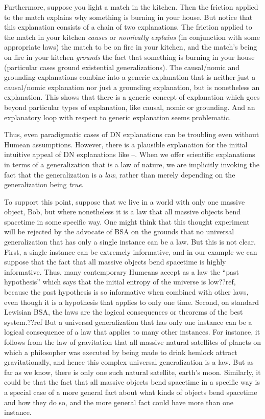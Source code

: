 Furthermore, suppose you light a match in the kitchen. Then the friction applied to the match explains why something is burning in 
your house. But notice that this explanation consists of a chain of two explanations. The friction applied to the match in your 
kitchen \textit{causes} or \textit{nomically explains} (in conjunction with some appropriate laws) the match to be on fire in your kitchen, and the match's being on fire in your kitchen \textit{grounds} the 
fact that something is burning in your house (particular cases ground existential generalizations). The causal/nomic and grounding explanations
combine into a generic explanation that is neither just a causal/nomic explanation nor just a grounding explanation, but is nonetheless an 
explanation. This shows that there is a generic concept of explanation which goes beyond particular types of explanation, like 
causal, nomic or grounding. And an explanatory loop with respect to generic explanation seems problematic.

Thus, even paradigmatic cases of DN explanations can be troubling even without Humean assumptions. However, there is a plausible explanation for the initial intuitive 
appeal of DN explanations like --. When we offer scientific explanations in terms of a generalization that is a 
law of nature, we are implicitly invoking the fact that the generalization is a \textit{law}, rather than
merely depending on the generalization being \textit{true}.

To support this point, suppose that we live in a world with only one massive object, Bob, but where nonetheless it is a law that all massive objects
bend spacetime in some specific way. One might think that this thought experiment will be rejected by the advocate of BSA on the grounds that no 
universal generalization that has only a single instance can be a law. But this is not clear. First, a single instance can be
extremely informative, and in our example we can suppose that the fact that all massive objects bend spacetime is
highly informative. Thus, many contemporary Humeans accept as a law the ``past hypothesis'' which says that the initial entropy of the
universe is low??ref, because the past hypothesis is so informative when combined with other laws, even though it is a hypothesis that applies
to only one time. Second, on standard Lewisian BSA, the laws are the logical consequences or theorems of the best system.??ref But a universal 
generalization that has only one instance can be a logical consequence of a law that applies to many other instances. For instance,
it follows from the law of gravitation that all massive natural satellites of planets on which a philosopher was executed by being
made to drink hemlock attract gravitationally, and hence this complex universal generalization is a law. But as far as we know, 
there is only one such natural satellite, earth's moon. Similarly, it could be that the fact that all massive objects bend spacetime in a specific way
is a special case of a more general fact about what kinds of objects bend spacetime and how they do so, and the more general fact could have
more than one instance. 

